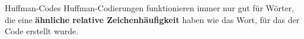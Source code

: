 \begin{frame}{Huffman-Codes}
		Huffman-Codierungen funktionieren immer nur gut für Wörter, die eine \textbf{ähnliche relative Zeichenhäufigkeit} haben wie das Wort, für das der Code erstellt wurde.
  \end{frame}
				
